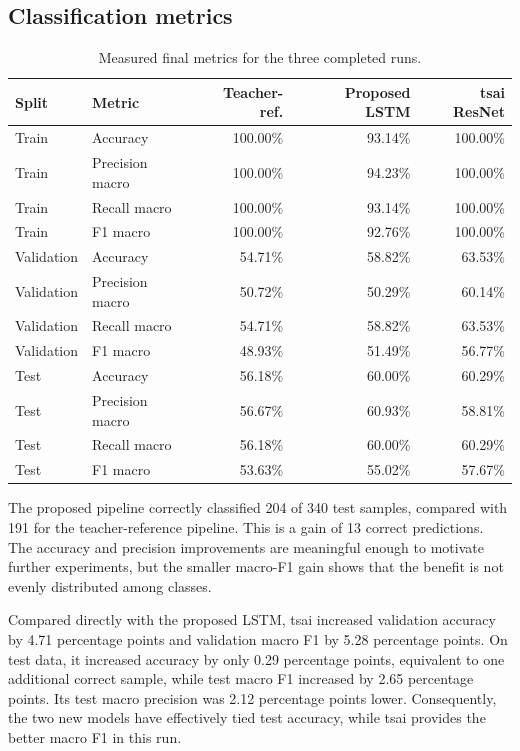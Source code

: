 \documentclass[11pt,a4paper]{article}
\begin{document}
\subsection{Classification metrics}

\begin{table}[htbp]
\centering
\caption{Measured final metrics for the three completed runs.}
\begin{tabular}{@{}llrrr@{}}
\toprule
\textbf{Split} & \textbf{Metric} &
\textbf{Teacher-ref.} & \textbf{Proposed LSTM} & \textbf{tsai ResNet} \\
\midrule
Train & Accuracy        & 100.00\% & 93.14\% & 100.00\% \\
Train & Precision macro & 100.00\% & 94.23\% & 100.00\% \\
Train & Recall macro    & 100.00\% & 93.14\% & 100.00\% \\
Train & F1 macro        & 100.00\% & 92.76\% & 100.00\% \\
\midrule
Validation & Accuracy        & 54.71\% & 58.82\% & 63.53\% \\
Validation & Precision macro & 50.72\% & 50.29\% & 60.14\% \\
Validation & Recall macro    & 54.71\% & 58.82\% & 63.53\% \\
Validation & F1 macro        & 48.93\% & 51.49\% & 56.77\% \\
\midrule
Test & Accuracy        & 56.18\% & 60.00\% & 60.29\% \\
Test & Precision macro & 56.67\% & 60.93\% & 58.81\% \\
Test & Recall macro    & 56.18\% & 60.00\% & 60.29\% \\
Test & F1 macro        & 53.63\% & 55.02\% & 57.67\% \\
\bottomrule
\end{tabular}
\end{table}

The proposed pipeline correctly classified 204 of 340 test samples, compared
with 191 for the teacher-reference pipeline. This is a gain of 13 correct
predictions. The accuracy and precision improvements are meaningful enough to
motivate further experiments, but the smaller macro-F1 gain shows that the
benefit is not evenly distributed among classes.

Compared directly with the proposed LSTM, tsai increased validation accuracy
by 4.71 percentage points and validation macro F1 by 5.28 percentage points.
On test data, it increased accuracy by only 0.29 percentage points, equivalent
to one additional correct sample, while test macro F1 increased by 2.65
percentage points. Its test macro precision was 2.12 percentage points lower.
Consequently, the two new models have effectively tied test accuracy, while
tsai provides the better macro F1 in this run.
\end{document}
